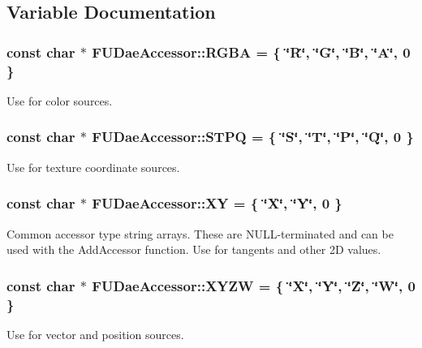 \subsection{Variable Documentation}
\hypertarget{namespaceFUDaeAccessor_a221226d2b1f56ac784b7801fa60cbe9c}{
\subsubsection[{RGBA}]{\setlength{\rightskip}{0pt plus 5cm}const char $\ast$ {\bf FUDaeAccessor::RGBA} = \{ \char`\"{}R\char`\"{}, \char`\"{}G\char`\"{}, \char`\"{}B\char`\"{}, \char`\"{}A\char`\"{}, 0 \}}}
\label{namespaceFUDaeAccessor_a221226d2b1f56ac784b7801fa60cbe9c}
Use for color sources. \hypertarget{namespaceFUDaeAccessor_a3951a6fad0eefe570cc5b450891c449f}{
\subsubsection[{STPQ}]{\setlength{\rightskip}{0pt plus 5cm}const char $\ast$ {\bf FUDaeAccessor::STPQ} = \{ \char`\"{}S\char`\"{}, \char`\"{}T\char`\"{}, \char`\"{}P\char`\"{}, \char`\"{}Q\char`\"{}, 0 \}}}
\label{namespaceFUDaeAccessor_a3951a6fad0eefe570cc5b450891c449f}
Use for texture coordinate sources. \hypertarget{namespaceFUDaeAccessor_a0918cc7895d223e683eeb6faaa6ccaf4}{
\subsubsection[{XY}]{\setlength{\rightskip}{0pt plus 5cm}const char $\ast$ {\bf FUDaeAccessor::XY} = \{ \char`\"{}X\char`\"{}, \char`\"{}Y\char`\"{}, 0 \}}}
\label{namespaceFUDaeAccessor_a0918cc7895d223e683eeb6faaa6ccaf4}
Common accessor type string arrays. These are NULL-\/terminated and can be used with the AddAccessor function. Use for tangents and other 2D values. \hypertarget{namespaceFUDaeAccessor_a5a5bd329a6d739c21ce31f2c44f020ae}{
\subsubsection[{XYZW}]{\setlength{\rightskip}{0pt plus 5cm}const char $\ast$ {\bf FUDaeAccessor::XYZW} = \{ \char`\"{}X\char`\"{}, \char`\"{}Y\char`\"{}, \char`\"{}Z\char`\"{}, \char`\"{}W\char`\"{}, 0 \}}}
\label{namespaceFUDaeAccessor_a5a5bd329a6d739c21ce31f2c44f020ae}
Use for vector and position sources. 